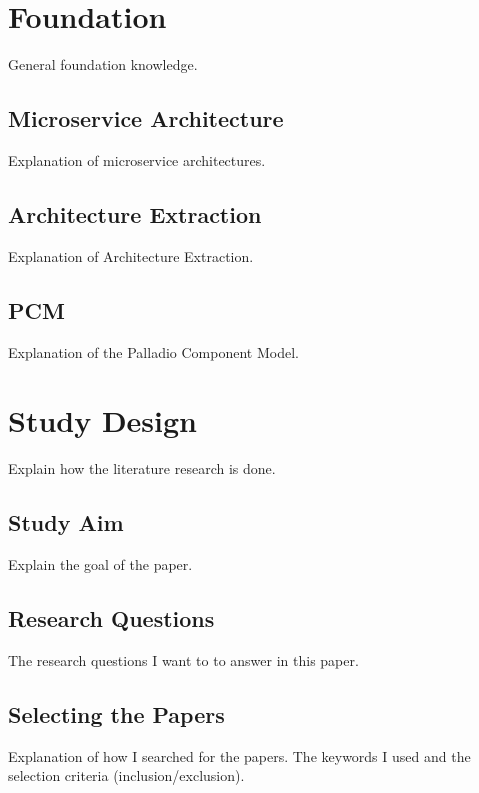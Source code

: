 
\section{Foundation}
\label{ch:Foundation}

General foundation knowledge.

\subsection{Microservice Architecture}
Explanation of microservice architectures.
\cite{Dragoni2017}

\subsection{Architecture Extraction}
\label{sec:FirstContentSection:FirstSubSubSection}
Explanation of Architecture Extraction.

\subsection{PCM}
\label{sec:FirstContentSection:FirstSubSection}
Explanation of the Palladio Component Model.
\cite{Becker2008}

\section{Study Design}
\label{sec:SecondContentSection:FirstSubsection}
Explain how the literature research is done.

\subsection{Study Aim}
\label{sec:SecondContentSection:SecondSubsection}
Explain the goal of the paper.

\subsection{Research Questions}
The research questions I want to to answer in this paper.

\subsection{Selecting the Papers}
Explanation of how I searched for the papers. The keywords I used and the selection criteria (inclusion/exclusion).

